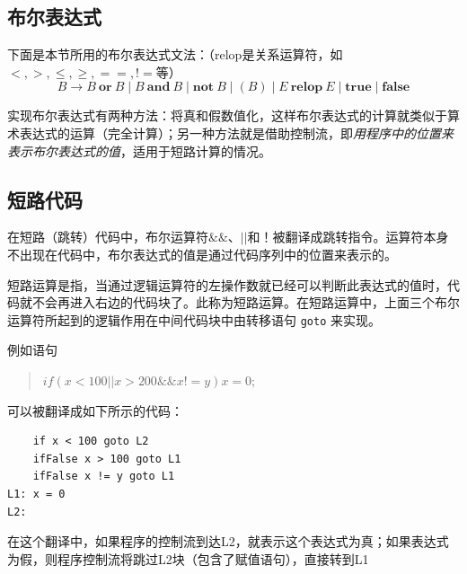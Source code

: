 \documentclass[]{report}
\begin{document}
		\subsection{布尔表达式}
			下面是本节所用的布尔表达式文法：（relop是关系运算符，如$<,>,\le,\ge,==,!=$等）
			\[B\to B\ \mathbf{or}\ B\mid B\ \mathbf{and}\ B\mid\mathbf{not}\ B\mid(B)\mid E\ \mathbf{relop}\ E\mid\mathbf{true}\mid\mathbf{false}\]\par
			实现布尔表达式有两种方法：将真和假数值化，这样布尔表达式的计算就类似于算术表达式的运算（完全计算）；另一种方法就是借助控制流，即\textit{用程序中的位置来表示布尔表达式的值}，适用于短路计算的情况。
		\subsection{短路代码}
		在短路（跳转）代码中，布尔运算符$\&\&$、$||$和！被翻译成跳转指令。运算符本身不出现在代码中，布尔表达式的值是通过代码序列中的位置来表示的。\par
		短路运算是指，当通过逻辑运算符的左操作数就已经可以判断此表达式的值时，代码就不会再进入右边的代码块了。此称为短路运算。在短路运算中，上面三个布尔运算符所起到的逻辑作用在中间代码块中由转移语句 \texttt{goto} 来实现。\par
		例如语句
		\begin{quote}
			$if(x<100 || x>200 \&\& x!=y) x=0;$
		\end{quote}
		可以被翻译成如下所示的代码：
\begin{verbatim}
    if x < 100 goto L2
    ifFalse x > 100 goto L1
    ifFalse x != y goto L1
L1:	x = 0
L2:
\end{verbatim}
		在这个翻译中，如果程序的控制流到达L2，就表示这个表达式为真；如果表达式为假，则程序控制流将跳过L2块（包含了赋值语句），直接转到L1
\end{document}
